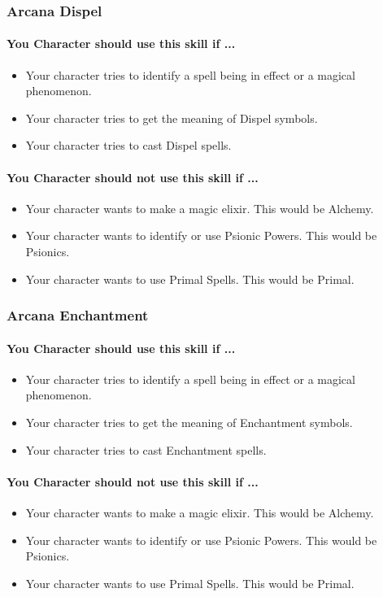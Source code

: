\begin{multicols}{2}
\subsubsection{Arcana Dispel}\label{skill:arcana_dispel}
\paragraph{You Character should use this skill if ...}
\begin{itemize}
    \item Your character tries to identify a spell being in effect or a magical
        phenomenon.
    \item Your character tries to get the meaning of Dispel symbols.
    \item Your character tries to cast Dispel spells.
\end{itemize}
\paragraph{You Character should not use this skill if ...}
\begin{itemize}
    \item Your character wants to make a magic elixir.  This would be Alchemy.
    \item Your character wants to identify or use Psionic Powers. This would be
        Psionics.
    \item Your character wants to use Primal Spells. This would be Primal.
\end{itemize}

\subsubsection{Arcana Enchantment}\label{skill:arcana_enchantment}
\paragraph{You Character should use this skill if ...}
\begin{itemize}
    \item Your character tries to identify a spell being in effect or a magical
        phenomenon.
    \item Your character tries to get the meaning of Enchantment symbols.
    \item Your character tries to cast Enchantment spells.
\end{itemize}
\paragraph{You Character should not use this skill if ...}
\begin{itemize}
    \item Your character wants to make a magic elixir.  This would be Alchemy.
    \item Your character wants to identify or use Psionic Powers. This would be
        Psionics.
    \item Your character wants to use Primal Spells. This would be Primal.
\end{itemize}


\end{multicols}
